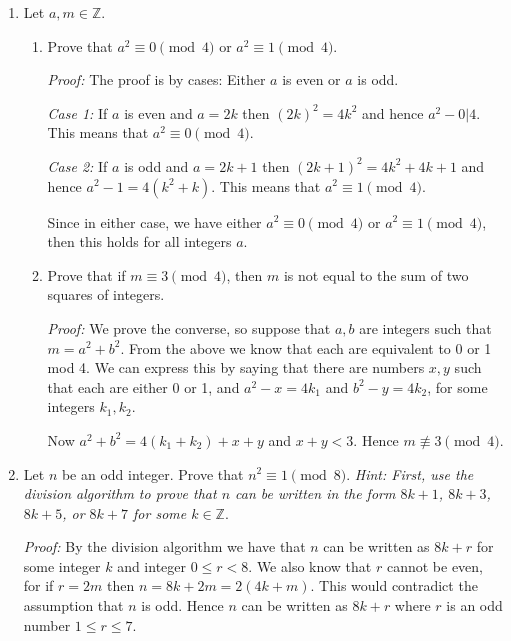 \documentclass[12pt]{article}
\begin{document}
{\begin{enumerate}
\begin{align*}
  ac &= (nk_1+b)(nk_2+d) \\
  &= n^2k_1k_2+nk_1d+nk_2b+bd. \\
\end{align*}

From this we can infer that $ac-bd = n(nk_1k_2+k_1d+k_2b)$.  Therefore $ac-bd|n$ and so $ac\equiv bd\pmod n$.\qed

\item Let $a, m \in \mathbb{Z}$.
\begin{enumerate}
\item Prove that $a^2 \equiv 0 \pmod 4$ or $a^2 \equiv 1 \pmod 4$.

{\it Proof:} The proof is by cases: Either $a$ is even or $a$ is odd.

{\it Case 1:}  If $a$ is even and $a=2k$ then $(2k)^2 = 4k^2$ and hence $a^2-0 | 4$.  This means that $a^2\equiv 0\pmod 4$.

{\it Case 2:} If $a$ is odd and $a=2k+1$ then $(2k+1)^2 = 4k^2+4k+1$ and hence $a^2-1 = 4(k^2+k)$.  This means that $a^2\equiv 1\pmod 4$.

Since in either case, we have either $a^2\equiv 0\pmod 4$ or $a^2\equiv 1\pmod 4$, then this holds for all integers $a$.

\item Prove that if $m \equiv 3 \pmod 4$, then $m$ is not equal to the sum of two squares of integers.

{\it Proof:} We prove the converse, so suppose that $a,b$ are integers such that $m=a^2+b^2$.  From the above we know that each are equivalent to 0 or 1 mod 4.  We can express this by saying that there are numbers $x,y$ such that each are either 0 or 1, and $a^2 - x= 4k_1$ and $b^2 - y= 4k_2$, for some integers $k_1,k_2$.

Now $a^2+b^2 = 4(k_1+k_2)+x+y$ and $x+y<3$.  Hence $m\not\equiv 3\pmod 4$.

\end{enumerate}

\item Let $n$ be an odd integer. Prove that $n^2 \equiv 1 \pmod 8$. \emph{Hint: First, use the division algorithm to prove that $n$ can be written in the form $8k + 1$, $8k + 3$, $8k + 5$, or $8k + 7$ for some $k \in \mathbb{Z}$}.

{\it Proof:}  By the division algorithm we have that $n$ can be written as $8k+r$ for some integer $k$ and integer $0\leq r<8$.  We also know that $r$ cannot be even, for if $r=2m$ then $n=8k+2m=2(4k+m)$.  This would contradict the assumption that $n$ is odd.  Hence $n$ can be written as $8k+r$ where $r$ is an odd number $1\leq r\leq 7$.


\end{enumerate}}
\end{document}
